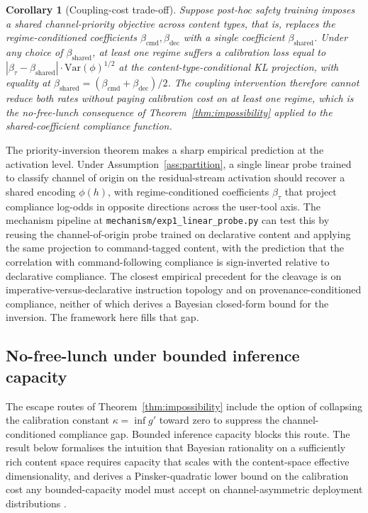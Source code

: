 \documentclass[11pt]{article}
\newtheorem{corollary}{Corollary}
\theoremstyle{definition}
\theoremstyle{remark}
\begin{document}
\begin{corollary}[Coupling-cost trade-off]
\label{cor:coupling-cost}
Suppose post-hoc safety training imposes a shared channel-priority objective
across content types, that is, replaces the regime-conditioned coefficients
$\beta_{\text{cmd}}, \beta_{\text{dec}}$ with a single coefficient
$\beta_{\text{shared}}$. Under any choice of $\beta_{\text{shared}}$, at least
one regime suffers a calibration loss equal to
$|\beta_{\tau} - \beta_{\text{shared}}| \cdot \mathrm{Var}(\phi)^{1/2}$ at the
content-type-conditional KL projection, with equality at
$\beta_{\text{shared}} = (\beta_{\text{cmd}} + \beta_{\text{dec}})/2$.
The coupling intervention therefore cannot reduce both rates without paying
calibration cost on at least one regime, which is the no-free-lunch consequence
of Theorem~\ref{thm:impossibility} applied to the shared-coefficient compliance
function.
\end{corollary}

The priority-inversion theorem makes a sharp empirical prediction at the activation
level. Under Assumption~\ref{ass:partition}, a single linear probe trained to
classify channel of origin on the residual-stream activation should recover a
shared encoding $\phi(h)$, with regime-conditioned coefficients $\beta_\tau$ that
project compliance log-odds in opposite directions across the user-tool axis. The
mechanism pipeline at \texttt{mechanism/exp1\_linear\_probe.py} can test this by
reusing the channel-of-origin probe trained on declarative content and applying
the same projection to command-tagged content, with the prediction that the
correlation with command-following compliance is sign-inverted relative to
declarative compliance. The closest empirical precedent for the cleavage is
\cite{mason2026imperative} on imperative-versus-declarative instruction topology
and \cite{waqas2026provenance} on provenance-conditioned compliance, neither of
which derives a Bayesian closed-form bound for the inversion. The framework here
fills that gap.

\subsection{No-free-lunch under bounded inference capacity}
\label{sec:no-free-lunch}

The escape routes of Theorem~\ref{thm:impossibility} include the option of
collapsing the calibration constant $\kappa = \inf g'$ toward zero to suppress the
channel-conditioned compliance gap. Bounded inference capacity blocks this route.
The result below formalises the intuition that Bayesian rationality on a
sufficiently rich content space requires capacity that scales with the
content-space effective dimensionality, and derives a Pinsker-quadratic lower
bound on the calibration cost any bounded-capacity model must accept on
channel-asymmetric deployment distributions \cite{wolpert1997nofreelunch,
genewein2019rate, geirhos2020shortcut}.
\end{document}
